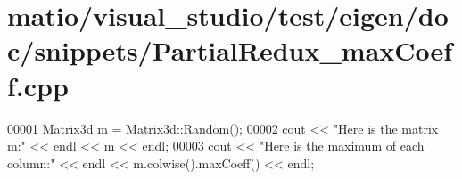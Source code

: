 \hypertarget{matio_2visual__studio_2test_2eigen_2doc_2snippets_2_partial_redux__max_coeff_8cpp_source}{}\section{matio/visual\+\_\+studio/test/eigen/doc/snippets/\+Partial\+Redux\+\_\+max\+Coeff.cpp}
\label{matio_2visual__studio_2test_2eigen_2doc_2snippets_2_partial_redux__max_coeff_8cpp_source}

\begin{DoxyCode}
00001 Matrix3d m = Matrix3d::Random();
00002 cout << \textcolor{stringliteral}{"Here is the matrix m:"} << endl << m << endl;
00003 cout << \textcolor{stringliteral}{"Here is the maximum of each column:"} << endl << m.colwise().maxCoeff() << endl;
\end{DoxyCode}
